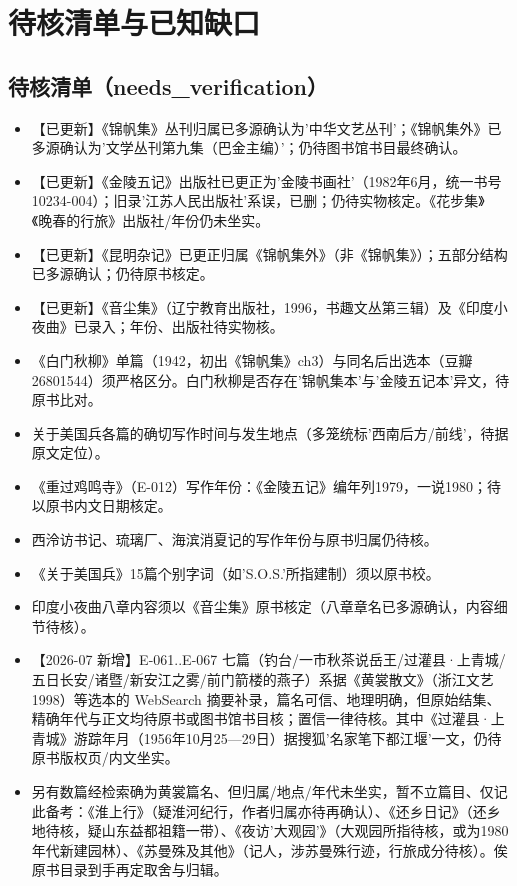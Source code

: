 \documentclass[UTF8,fontset=none,zihao=-4,a4paper]{ctexart}
\begin{document}
\section{待核清单与已知缺口}
\subsection{待核清单（needs\_verification）}
\begin{itemize}
\item 【已更新】《锦帆集》丛刊归属已多源确认为'中华文艺丛刊'；《锦帆集外》已多源确认为'文学丛刊第九集（巴金主编）'；仍待图书馆书目最终确认。
\item 【已更新】《金陵五记》出版社已更正为'金陵书画社'（1982年6月，统一书号10234-004）；旧录'江苏人民出版社'系误，已删；仍待实物核定。《花步集》《晚春的行旅》出版社/年份仍未坐实。
\item 【已更新】《昆明杂记》已更正归属《锦帆集外》（非《锦帆集》）；五部分结构已多源确认；仍待原书核定。
\item 【已更新】《音尘集》（辽宁教育出版社，1996，书趣文丛第三辑）及《印度小夜曲》已录入；年份、出版社待实物核。
\item 《白门秋柳》单篇（1942，初出《锦帆集》ch3）与同名后出选本（豆瓣26801544）须严格区分。白门秋柳是否存在'锦帆集本'与'金陵五记本'异文，待原书比对。
\item 关于美国兵各篇的确切写作时间与发生地点（多笼统标'西南后方/前线'，待据原文定位）。
\item 《重过鸡鸣寺》（E-012）写作年份：《金陵五记》编年列1979，一说1980；待以原书内文日期核定。
\item 西泠访书记、琉璃厂、海滨消夏记的写作年份与原书归属仍待核。
\item 《关于美国兵》15篇个别字词（如'S.O.S.'所指建制）须以原书校。
\item 印度小夜曲八章内容须以《音尘集》原书核定（八章章名已多源确认，内容细节待核）。
\item 【2026-07 新增】E-061..E-067 七篇（钓台/一市秋茶说岳王/过灌县·上青城/五日长安/诸暨/新安江之雾/前门箭楼的燕子）系据《黄裳散文》（浙江文艺1998）等选本的 WebSearch 摘要补录，篇名可信、地理明确，但原始结集、精确年代与正文均待原书或图书馆书目核；置信一律待核。其中《过灌县·上青城》游踪年月（1956年10月25—29日）据搜狐'名家笔下都江堰'一文，仍待原书版权页/内文坐实。
\item 另有数篇经检索确为黄裳篇名、但归属/地点/年代未坐实，暂不立篇目、仅记此备考：《淮上行》（疑淮河纪行，作者归属亦待再确认）、《还乡日记》（还乡地待核，疑山东益都祖籍一带）、《夜访'大观园'》（大观园所指待核，或为1980年代新建园林）、《苏曼殊及其他》（记人，涉苏曼殊行迹，行旅成分待核）。俟原书目录到手再定取舍与归辑。
\end{itemize}
\end{document}
